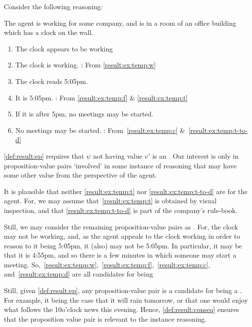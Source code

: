 \begin{note}
  Consider the following reasoning:
  \begin{example}\mbox{}
    The agent is working for some company, and is in a room of an office building which has a clock on the wall.
    \begin{enumerate}[label=\arabic*., ref=(\arabic*)]
    \item\label{result:ex:temp:w} The clock appears to be working
    \item\label{result:ex:temp:f} The clock is working. \hfill \CStepA{}: From \ref{result:ex:temp:w}
    \item\label{result:ex:temp:t} The clock reads 5:05pm.
    \item\label{result:ex:temp:c} It is 5:05pm. \hfill \CStepB{}: From \ref{result:ex:temp:f} \& \ref{result:ex:temp:t}
    \item\label{result:ex:temp:t-to-d} If it is after 5pm, no meetings may be started.
    \item\label{result:ex:temp:d} No meetings may be started.
      \hfill \CStepC{}: From~\ref{result:ex:temp:c} \&~\ref{result:ex:temp:t-to-d}
    \end{enumerate}
  \end{example}

  \ref{def:result:ep} requires that \(\psi\) not having value \(v'\) is an \ep{}.
  Our interest is only in proposition-value pairs `involved' in some instance of reasoning that may have some other value from the perspective of the agent.

  It is plausible that neither \ref{result:ex:temp:t} nor \ref{result:ex:temp:t-to-d} are  for the agent.
  For, we may assume that~\ref{result:ex:temp:t} is obtained by visual inspection, and that \ref{result:ex:temp:t-to-d} is part of the company's rule-book.

  Still, we may consider the remaining proposition-value pairs as \ep{}.
  For, the clock may not be working, and, as the agent appeals to the clock working in order to reason to it being 5:05pm, it (also) may not be 5:05pm.
  In particular, it may be that it is 4:55pm, and so there is a few minutes in which someone may start a meeting.
  So,~\ref{result:ex:temp:w},~\ref{result:ex:temp:f},~\ref{result:ex:temp:c}, and~\ref{result:ex:temp:d} are all candidates for being 
\end{note}

\begin{note}
  Still, given \ref{def:result:ep}, any \ep{} proposition-value pair is a candidate for being a \result{}.
  For example, it being the case that it will rain tomorrow, or that one would enjoy what follows the 10o'clock news this evening.
  Hence, \ref{def:result:conseq} ensures that the proposition value pair is relevant to the instance reasoning.
\end{note}


